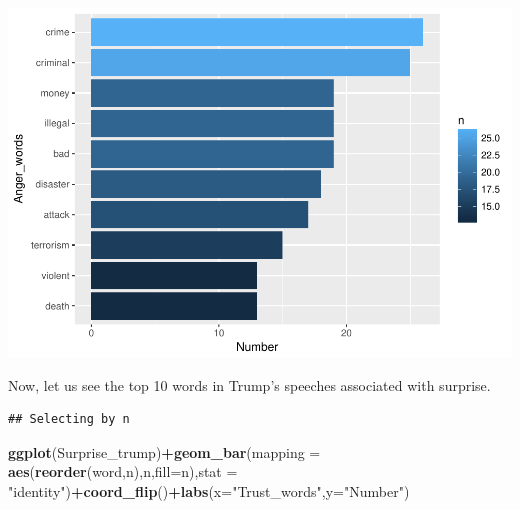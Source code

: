 \documentclass[]{article}
\newenvironment{Shaded}{\begin{snugshade}}{\end{snugshade}}
\newcommand{\KeywordTok}[1]{\textcolor[rgb]{0.13,0.29,0.53}{\textbf{#1}}}
\newcommand{\DataTypeTok}[1]{\textcolor[rgb]{0.13,0.29,0.53}{#1}}
\newcommand{\DecValTok}[1]{\textcolor[rgb]{0.00,0.00,0.81}{#1}}
\newcommand{\StringTok}[1]{\textcolor[rgb]{0.31,0.60,0.02}{#1}}
\newcommand{\OperatorTok}[1]{\textcolor[rgb]{0.81,0.36,0.00}{\textbf{#1}}}
\newcommand{\NormalTok}[1]{#1}
\begin{document}
\includegraphics{Donald_Trump_Speech_sentiment_analysis_files/figure-latex/unnamed-chunk-34-1.pdf}

Now, let us see the top 10 words in Trump's speeches associated with
surprise.

\begin{Shaded}
\end{Shaded}

\begin{verbatim}
## Selecting by n
\end{verbatim}

\begin{Shaded}
\begin{Highlighting}[]
\KeywordTok{ggplot}\NormalTok{(Surprise_trump)}\OperatorTok{+}\KeywordTok{geom_bar}\NormalTok{(}\DataTypeTok{mapping =} \KeywordTok{aes}\NormalTok{(}\KeywordTok{reorder}\NormalTok{(word,n),n,}\DataTypeTok{fill=}\NormalTok{n),}\DataTypeTok{stat =} \StringTok{"identity"}\NormalTok{)}\OperatorTok{+}\KeywordTok{coord_flip}\NormalTok{()}\OperatorTok{+}\KeywordTok{labs}\NormalTok{(}\DataTypeTok{x=}\StringTok{"Trust_words"}\NormalTok{,}\DataTypeTok{y=}\StringTok{"Number"}\NormalTok{)}
\end{Highlighting}
\end{Shaded}
\end{document}
